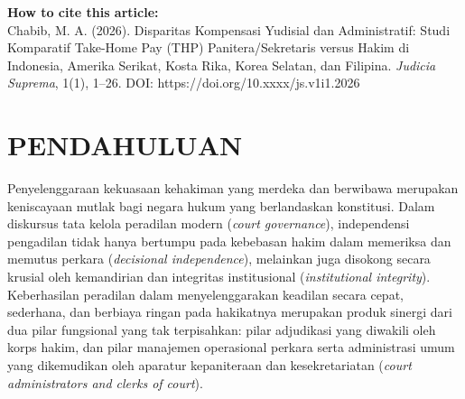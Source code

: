 \documentclass[12pt, a4paper]{article}
\begin{document}
\vspace{1.5em}
\noindent
\colorbox{gray!15}{%
\begin{minipage}{\dimexpr\textwidth-2\fboxsep\relax}
    \centering
    \vspace{0.5em}
    \textbf{How to cite this article:}\\
    Chabib, M. A. (2026). Disparitas Kompensasi Yudisial dan Administratif: Studi Komparatif Take-Home Pay (THP) Panitera/Sekretaris versus Hakim di Indonesia, Amerika Serikat, Kosta Rika, Korea Selatan, dan Filipina. \textit{Judicia Suprema}, 1(1), 1--26. DOI: https://doi.org/10.xxxx/js.v1i1.2026
    \vspace{0.5em}
\end{minipage}}

\vspace{2em}

\section{PENDAHULUAN}

Penyelenggaraan kekuasaan kehakiman yang merdeka dan berwibawa merupakan keniscayaan mutlak bagi negara hukum yang berlandaskan konstitusi. Dalam diskursus tata kelola peradilan modern (\textit{court governance}), independensi pengadilan tidak hanya bertumpu pada kebebasan hakim dalam memeriksa dan memutus perkara (\textit{decisional independence}), melainkan juga disokong secara krusial oleh kemandirian dan integritas institusional (\textit{institutional integrity}). Keberhasilan peradilan dalam menyelenggarakan keadilan secara cepat, sederhana, dan berbiaya ringan pada hakikatnya merupakan produk sinergi dari dua pilar fungsional yang tak terpisahkan: pilar adjudikasi yang diwakili oleh korps hakim, dan pilar manajemen operasional perkara serta administrasi umum yang dikemudikan oleh aparatur kepaniteraan dan kesekretariatan (\textit{court administrators and clerks of court}).
\end{document}
